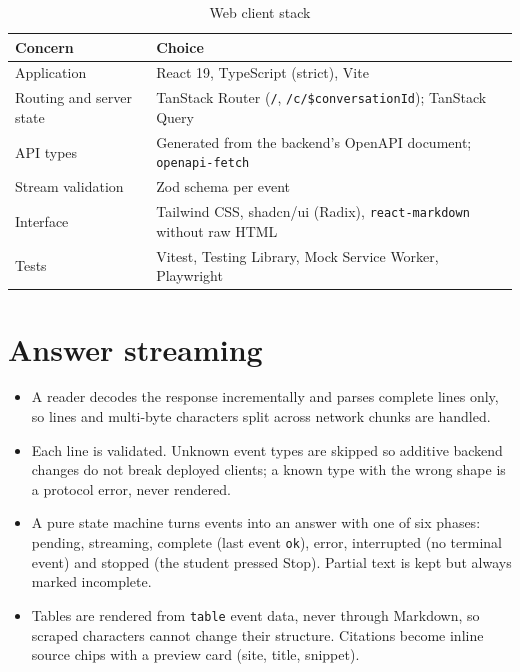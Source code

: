 \documentclass[11pt,letterpaper]{report}
\begin{document}
\begin{table}[H]
\centering
\caption{Web client stack}\label{tab:clientstack}
\begin{tabularx}{\textwidth}{@{}P{3.6cm}L@{}}
\toprule
\textbf{Concern} & \textbf{Choice} \\
\midrule
Application & React 19, TypeScript (strict), Vite \\
Routing and server state & TanStack Router (\texttt{/}, \texttt{/c/\$conversationId}); TanStack Query \\
API types & Generated from the backend's OpenAPI document; \texttt{openapi-fetch} \\
Stream validation & Zod schema per event \\
Interface & Tailwind CSS, shadcn/ui (Radix), \texttt{react-markdown} without raw HTML \\
Tests & Vitest, Testing Library, Mock Service Worker, Playwright \\
\bottomrule
\end{tabularx}
\end{table}

\section{Answer streaming}
\begin{itemize}
  \item A reader decodes the response incrementally and parses complete lines only, so lines and
        multi-byte characters split across network chunks are handled.
  \item Each line is validated. Unknown event types are skipped so additive backend changes do not
        break deployed clients; a known type with the wrong shape is a protocol error, never rendered.
  \item A pure state machine turns events into an answer with one of six phases: pending, streaming,
        complete (last event \texttt{ok}), error, interrupted (no terminal event) and stopped (the
        student pressed Stop). Partial text is kept but always marked incomplete.
  \item Tables are rendered from \texttt{table} event data, never through Markdown, so scraped
        characters cannot change their structure. Citations become inline source chips with a preview
        card (site, title, snippet).
\end{itemize}
\end{document}
